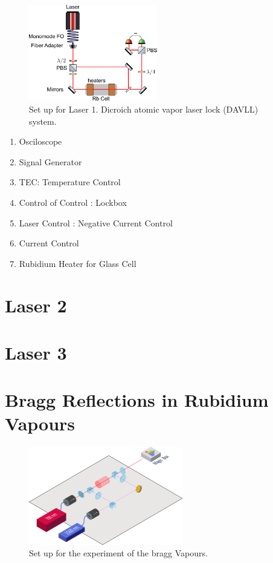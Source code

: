 \documentclass[10pt]{article}
\begin{document}
\begin{figure}[h]
    \centering
    \includegraphics[width=0.5\textwidth]{img/rect5909.png}
    \caption{Set up for Laser 1. Dicroich atomic vapor laser lock (DAVLL) system.}
    \label{fig:laser1}
\end{figure}

\begin{enumerate}
    \item Osciloscope
    \item Signal Generator
    \item TEC: Temperature Control
    \item Control of Control : Lockbox
    \item Laser Control : Negative Current Control
    \item Current Control %
    \item Rubidium Heater for Glass Cell
\end{enumerate}

\section*{Laser 2}

\section*{Laser 3}


\section*{Bragg Reflections in Rubidium Vapours}

\begin{figure}
    \centering
    \includegraphics[width=0.6\textwidth]{img/path16176.png}
    \caption{Set up for the experiment of the bragg Vapours.}
    \label{fig:braggref1}
\end{figure}
\end{document}
